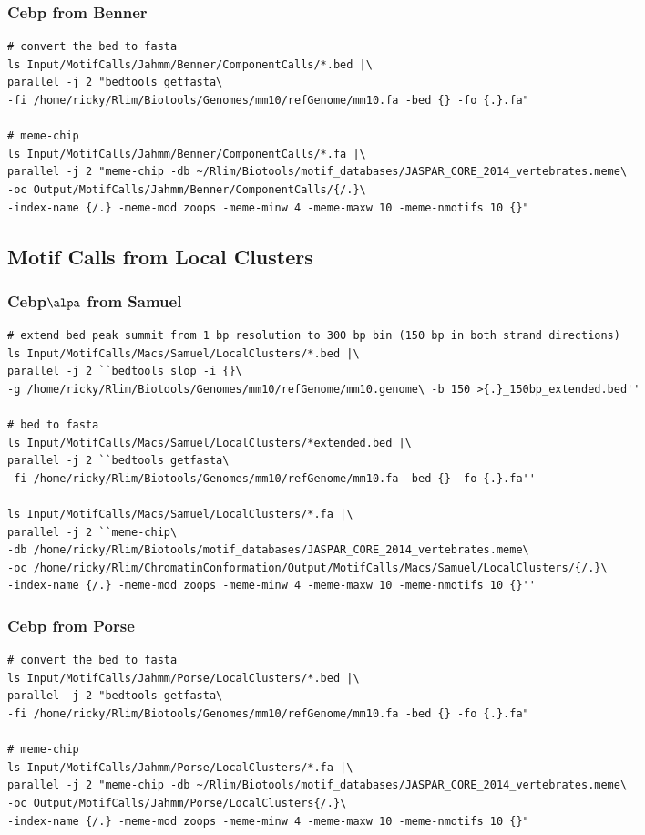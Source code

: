 \documentclass{article}\usepackage[]{graphicx}\usepackage[]{color}
\begin{document}
\subsubsection{Cebp from Benner}
\begin{verbatim}
# convert the bed to fasta
ls Input/MotifCalls/Jahmm/Benner/ComponentCalls/*.bed |\ 
parallel -j 2 "bedtools getfasta\ 
-fi /home/ricky/Rlim/Biotools/Genomes/mm10/refGenome/mm10.fa -bed {} -fo {.}.fa"

# meme-chip
ls Input/MotifCalls/Jahmm/Benner/ComponentCalls/*.fa |\ 
parallel -j 2 "meme-chip -db ~/Rlim/Biotools/motif_databases/JASPAR_CORE_2014_vertebrates.meme\ 
-oc Output/MotifCalls/Jahmm/Benner/ComponentCalls/{/.}\ 
-index-name {/.} -meme-mod zoops -meme-minw 4 -meme-maxw 10 -meme-nmotifs 10 {}"
\end{verbatim}

\subsection{Motif Calls from Local Clusters}
\subsubsection{Cebp$\alpa$ from Samuel}

\begin{verbatim}
# extend bed peak summit from 1 bp resolution to 300 bp bin (150 bp in both strand directions)
ls Input/MotifCalls/Macs/Samuel/LocalClusters/*.bed |\ 
parallel -j 2 ``bedtools slop -i {}\ 
-g /home/ricky/Rlim/Biotools/Genomes/mm10/refGenome/mm10.genome\ -b 150 >{.}_150bp_extended.bed''

# bed to fasta
ls Input/MotifCalls/Macs/Samuel/LocalClusters/*extended.bed |\ 
parallel -j 2 ``bedtools getfasta\ 
-fi /home/ricky/Rlim/Biotools/Genomes/mm10/refGenome/mm10.fa -bed {} -fo {.}.fa''

ls Input/MotifCalls/Macs/Samuel/LocalClusters/*.fa |\ 
parallel -j 2 ``meme-chip\ 
-db /home/ricky/Rlim/Biotools/motif_databases/JASPAR_CORE_2014_vertebrates.meme\ 
-oc /home/ricky/Rlim/ChromatinConformation/Output/MotifCalls/Macs/Samuel/LocalClusters/{/.}\ 
-index-name {/.} -meme-mod zoops -meme-minw 4 -meme-maxw 10 -meme-nmotifs 10 {}''

\end{verbatim}

\subsubsection{Cebp from Porse}
\begin{verbatim}
# convert the bed to fasta
ls Input/MotifCalls/Jahmm/Porse/LocalClusters/*.bed |\ 
parallel -j 2 "bedtools getfasta\ 
-fi /home/ricky/Rlim/Biotools/Genomes/mm10/refGenome/mm10.fa -bed {} -fo {.}.fa"

# meme-chip
ls Input/MotifCalls/Jahmm/Porse/LocalClusters/*.fa |\ 
parallel -j 2 "meme-chip -db ~/Rlim/Biotools/motif_databases/JASPAR_CORE_2014_vertebrates.meme\ 
-oc Output/MotifCalls/Jahmm/Porse/LocalClusters{/.}\ 
-index-name {/.} -meme-mod zoops -meme-minw 4 -meme-maxw 10 -meme-nmotifs 10 {}"
\end{verbatim}
\end{document}
